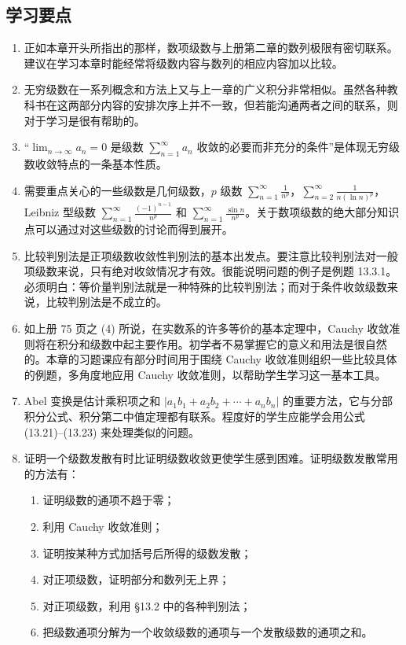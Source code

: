 \subsection{学习要点}

\begin{enumerate}[label=\arabic*.]
\item 正如本章开头所指出的那样，数项级数与上册第二章的数列极限有密切联系。建议在学习本章时能经常将级数内容与数列的相应内容加以比较。
\item 无穷级数在一系列概念和方法上又与上一章的广义积分非常相似。虽然各种教科书在这两部分内容的安排次序上并不一致，但若能沟通两者之间的联系，则对于学习是很有帮助的。
\item “$\lim_{n\to\infty}a_n=0$ 是级数 $\sum_{n=1}^{\infty}a_n$ 收敛的必要而非充分的条件”是体现无穷级数收敛特点的一条基本性质。
\item 需要重点关心的一些级数是几何级数，$p$ 级数 $\sum_{n=1}^{\infty}\frac1{n^p}$，$\sum_{n=2}^{\infty}\frac1{n(\ln n)^p}$，Leibniz 型级数 $\sum_{n=1}^{\infty}\frac{(-1)^{n-1}}{n^p}$ 和 $\sum_{n=1}^{\infty}\frac{\sin n}{n^p}$。关于数项级数的绝大部分知识点可以通过对这些级数的讨论而得到展开。
\item 比较判别法是正项级数收敛性判别法的基本出发点。要注意比较判别法对一般项级数来说，只有绝对收敛情况才有效。很能说明问题的例子是例题 13.3.1。必须明白：等价量判别法就是一种特殊的比较判别法；而对于条件收敛级数来说，比较判别法是不成立的。
\item 如上册 75 页之 (4) 所说，在实数系的许多等价的基本定理中，Cauchy 收敛准则将在积分和级数中起主要作用。初学者不易掌握它的意义和用法是很自然的。本章的习题课应有部分时间用于围绕 Cauchy 收敛准则组织一些比较具体的例题，多角度地应用 Cauchy 收敛准则，以帮助学生学习这一基本工具。
\item Abel 变换是估计乘积项之和 $|a_1b_1+a_2b_2+\cdots+a_nb_n|$ 的重要方法，它与分部积分公式、积分第二中值定理都有联系。程度好的学生应能学会用公式 (13.21)--(13.23) 来处理类似的问题。
\item 证明一个级数发散有时比证明级数收敛更使学生感到困难。证明级数发散常用的方法有：
\begin{enumerate}[label=(\arabic*)]
\item 证明级数的通项不趋于零；
\item 利用 Cauchy 收敛准则；
\item 证明按某种方式加括号后所得的级数发散；
\item 对正项级数，证明部分和数列无上界；
\item 对正项级数，利用 §13.2 中的各种判别法；
\item 把级数通项分解为一个收敛级数的通项与一个发散级数的通项之和。
\end{enumerate}
\end{enumerate}


